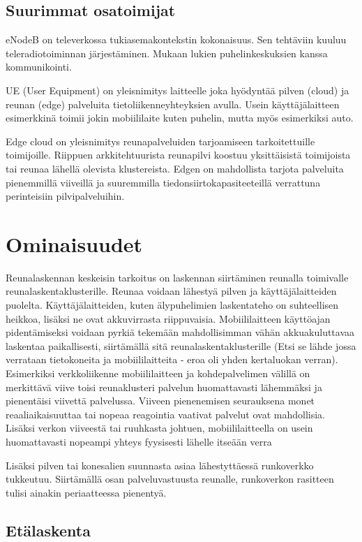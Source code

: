\documentclass[finnish]{tktltiki2}
\theoremstyle{definition}
\theoremstyle{remark}
\begin{document}
\subsection{Suurimmat osatoimijat}
eNodeB on televerkossa tukiasemakontekstin kokonaisuus. Sen tehtäviin kuuluu teleradiotoiminnan järjestäminen. Mukaan lukien puhelinkeskuksien kanssa kommunikointi.

UE (User Equipment) on yleisnimitys laitteelle joka hyödyntää pilven (cloud) ja reunan (edge) palveluita tietoliikenneyhteyksien avulla. Usein käyttäjälaitteen esimerkkinä toimii jokin mobiililaite kuten puhelin, mutta myös esimerkiksi auto. 

Edge cloud on yleisnimitys reunapalveluiden tarjoamiseen tarkoitettuille toimijoille. Riippuen arkkitehtuurista reunapilvi koostuu yksittäisistä toimijoista tai reunaa lähellä olevista klustereista. Edgen on mahdollista tarjota palveluita pienemmillä viiveillä ja suuremmilla tiedonsiirtokapasiteeteillä verrattuna perinteisiin pilvipalveluihin. 

\section{Ominaisuudet}

Reunalaskennan keskeisin tarkoitus on laskennan siirtäminen reunalla toimivalle reunalaskentaklusterille. Reunaa voidaan lähestyä pilven ja käyttäjälaitteiden puolelta. Käyttäjälaitteiden, kuten älypuhelimien laskentateho on suhteellisen heikkoa, lisäksi ne ovat akkuvirrasta riippuvaisia. 
Mobiililaitteen käyttöajan pidentämiseksi voidaan pyrkiä tekemään mahdollisimman vähän akkuakuluttavaa laskentaa paikallisesti, siirtämällä sitä reunalaskentaklusterille (Etsi se lähde jossa verrataan tietokoneita ja mobiililaitteita - eroa oli yhden kertaluokan verran).
Esimerkiksi verkkoliikenne mobiililaitteen ja kohdepalvelimen välillä on merkittävä viive toisi reunaklusteri palvelun huomattavasti lähemmäksi ja pienentäisi viivettä palvelussa. Viiveen pienenemisen seurauksena monet reaaliaikaisuuttaa tai nopeaa reagointia vaativat palvelut ovat mahdollisia. Lisäksi verkon viiveestä tai ruuhkasta johtuen, mobiililaitteella on usein huomattavasti nopeampi yhteys fyysisesti lähelle itseään verra

Lisäksi pilven tai konesalien suunnasta asiaa lähestyttäessä runkoverkko tukkeutuu. Siirtämällä osan palveluvastuusta reunalle, runkoverkon rasitteen tulisi ainakin periaatteessa pienentyä. 


\subsection{Etälaskenta}
\end{document}
